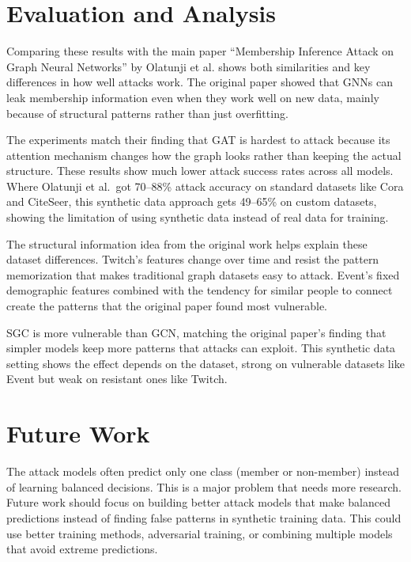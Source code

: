 \documentclass{article}
\begin{document}
\section{Evaluation and Analysis}

Comparing these results with the main paper ``Membership Inference Attack on Graph Neural Networks'' by Olatunji et al.\cite{olatunji2021membershipinferenceattackgraph} shows both similarities and key differences in how well attacks work. The original paper showed that GNNs can leak membership information even when they work well on new data, mainly because of structural patterns rather than just overfitting.

The experiments match their finding that GAT is hardest to attack because its attention mechanism changes how the graph looks rather than keeping the actual structure. These results show much lower attack success rates across all models. Where Olatunji et al.\ got 70--88\% attack accuracy on standard datasets like Cora and CiteSeer, this synthetic data approach gets 49--65\% on custom datasets, showing the limitation of using synthetic data instead of real data for training.

The structural information idea from the original work helps explain these dataset differences. Twitch's features change over time and resist the pattern memorization that makes traditional graph datasets easy to attack. Event's fixed demographic features combined with the tendency for similar people to connect create the patterns that the original paper found most vulnerable.

SGC is more vulnerable than GCN, matching the original paper's finding that simpler models keep more patterns that attacks can exploit. This synthetic data setting shows the effect depends on the dataset, strong on vulnerable datasets like Event but weak on resistant ones like Twitch.

\section{Future Work}

The attack models often predict only one class (member or non-member) instead of learning balanced decisions. This is a major problem that needs more research. Future work should focus on building better attack models that make balanced predictions instead of finding false patterns in synthetic training data. This could use better training methods, adversarial training, or combining multiple models that avoid extreme predictions.
\end{document}
